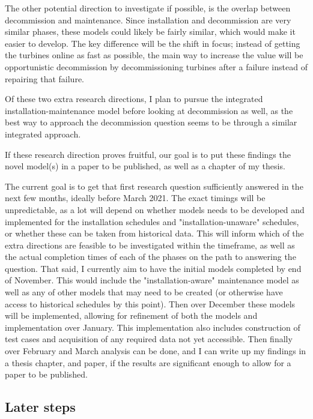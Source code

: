 \documentclass[a4paper,12pt]{article}
\begin{document}
The other potential direction to investigate if possible, is the overlap between decommission and maintenance. Since installation and decommission are very similar phases, these models could likely be fairly similar, which would make it easier to develop. The key difference will be the shift in focus; instead of getting the turbines online as fast as possible, the main way to increase the value will be opportunistic decommission by decommissioning turbines after a failure instead of repairing that failure. 

Of these two extra research directions, I plan to pursue the integrated installation-maintenance model before looking at decommission as well, as the best way to approach the decommission question seems to be through a similar integrated approach. 

\bigskip

If these research direction proves fruitful, our goal is to put these findings the novel model(s) in a paper to be published, as well as a chapter of my thesis. 

The current goal is to get that first research question sufficiently answered in the next few months, ideally before March 2021. The exact timings will be unpredictable, as a lot will depend on whether models needs to be developed and implemented for the installation schedules and "installation-unaware" schedules, or whether these can be taken from historical data. This will inform which of the extra directions are feasible to be investigated within the timeframe, as well as the actual completion times of each of the phases on the path to answering the question. That said, I currently aim to have the initial models completed by end of November. This would include the "installation-aware" maintenance model as well as any of other models that may need to be created (or otherwise have access to historical schedules by this point). Then over December these models will be implemented, allowing for refinement of both the models and implementation over January. This implementation also includes construction of test cases and acquisition of any required data not yet accessible. Then finally over February and March analysis can be done, and I can write up my findings in a thesis chapter, and paper, if the results are significant enough to allow for a paper to be published. 

\subsection{Later steps}
\end{document}
